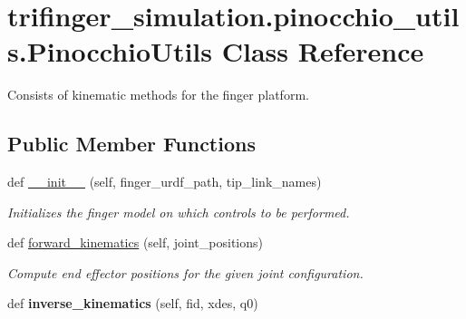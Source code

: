 \hypertarget{classtrifinger__simulation_1_1pinocchio__utils_1_1PinocchioUtils}{}\section{trifinger\+\_\+simulation.\+pinocchio\+\_\+utils.\+Pinocchio\+Utils Class Reference}
\label{classtrifinger__simulation_1_1pinocchio__utils_1_1PinocchioUtils}


Consists of kinematic methods for the finger platform.  


\subsection*{Public Member Functions}
\begin{DoxyCompactItemize}
\item 
def \hyperlink{classtrifinger__simulation_1_1pinocchio__utils_1_1PinocchioUtils_a84604fe179b9237b4a842bf03a9640cb}{\+\_\+\+\_\+init\+\_\+\+\_\+} (self, finger\+\_\+urdf\+\_\+path, tip\+\_\+link\+\_\+names)
\begin{DoxyCompactList}\small\item\em Initializes the finger model on which control\textquotesingle{}s to be performed. \end{DoxyCompactList}\item 
def \hyperlink{classtrifinger__simulation_1_1pinocchio__utils_1_1PinocchioUtils_a8bc685bf062c9fd89f29fe55081a693c}{forward\+\_\+kinematics} (self, joint\+\_\+positions)
\begin{DoxyCompactList}\small\item\em Compute end effector positions for the given joint configuration. \end{DoxyCompactList}\item 
\mbox{\label{classtrifinger__simulation_1_1pinocchio__utils_1_1PinocchioUtils_a20c29735b3122fca5f37580cd0341987}} 
def {\bfseries inverse\+\_\+kinematics} (self, fid, xdes, q0)
\end{DoxyCompactItemize}

